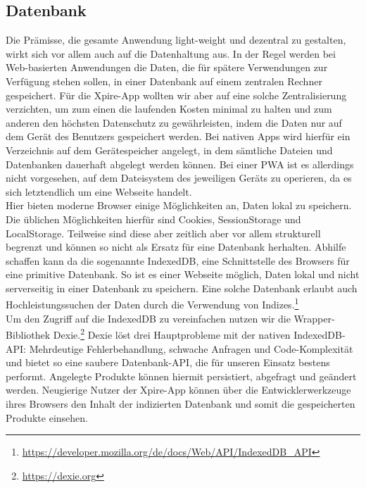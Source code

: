 \subsection{Datenbank}	
Die Prämisse, die gesamte Anwendung light-weight und dezentral zu gestalten, wirkt sich vor allem auch auf die Datenhaltung aus. In der Regel werden bei Web-basierten Anwendungen die Daten, die für spätere Verwendungen zur Verfügung stehen sollen, in einer Datenbank auf einem zentralen Rechner gespeichert. Für die Xpire-App wollten wir aber auf eine solche Zentralisierung verzichten, um zum einen die laufenden Kosten minimal zu halten und zum anderen den höchsten Datenschutz zu gewährleisten, indem die Daten nur auf dem Gerät des Benutzers gespeichert werden. Bei nativen Apps wird hierfür ein Verzeichnis auf dem Gerätespeicher angelegt, in dem sämtliche Dateien und Datenbanken dauerhaft abgelegt werden können. Bei einer \ac{PWA} ist es allerdings nicht vorgesehen, auf dem Dateisystem des jeweiligen Geräts zu operieren, da es sich letztendlich um eine Webseite handelt.\\
Hier bieten moderne Browser einige Möglichkeiten an, Daten lokal zu speichern. Die üblichen Möglichkeiten hierfür sind Cookies, SessionStorage und LocalStorage. Teilweise sind diese aber zeitlich aber vor allem strukturell begrenzt und können so nicht als Ersatz für eine Datenbank herhalten. Abhilfe schaffen kann da die sogenannte IndexedDB, eine Schnittstelle des Browsers für eine primitive Datenbank. So ist es einer Webseite möglich, Daten lokal und nicht serverseitig in einer Datenbank zu speichern. Eine solche Datenbank erlaubt auch Hochleistungssuchen der Daten durch die Verwendung von Indizes.\footnote{\url{https://developer.mozilla.org/de/docs/Web/API/IndexedDB_API}}\\
Um den Zugriff auf die IndexedDB zu vereinfachen nutzen wir die Wrapper-Bibliothek Dexie.\footnote{\url{https://dexie.org}} 
Dexie löst drei Hauptprobleme mit der nativen IndexedDB-API:
Mehrdeutige Fehlerbehandlung, schwache Anfragen und
Code-Komplexität und bietet so eine saubere Datenbank-API, die für unseren Einsatz bestens performt. Angelegte Produkte können hiermit persistiert, abgefragt und geändert werden. Neugierige Nutzer der Xpire-App können über die Entwicklerwerkzeuge ihres Browsers den Inhalt der indizierten Datenbank und somit die gespeicherten Produkte einsehen. 
	
